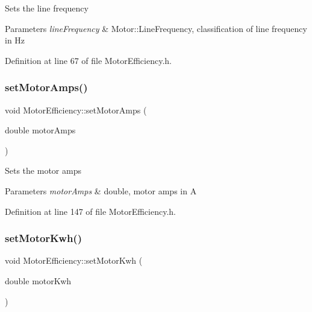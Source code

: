 Sets the line frequency 
\begin{DoxyParams}{Parameters}
{\em line\+Frequency} & Motor\+::\+Line\+Frequency, classification of line frequency in Hz \\
\hline
\end{DoxyParams}


Definition at line 67 of file Motor\+Efficiency.\+h.

\mbox{\label{class_motor_efficiency_ac86aa8d6162e63eb440e07e557534c74}} 
\subsubsection{\texorpdfstring{set\+Motor\+Amps()}{setMotorAmps()}}
{\footnotesize\ttfamily void Motor\+Efficiency\+::set\+Motor\+Amps (\begin{DoxyParamCaption}\item[{double}]{motor\+Amps }\end{DoxyParamCaption})\hspace{0.3cm}{\ttfamily [inline]}}

Sets the motor amps 
\begin{DoxyParams}{Parameters}
{\em motor\+Amps} & double, motor amps in A \\
\hline
\end{DoxyParams}


Definition at line 147 of file Motor\+Efficiency.\+h.

\mbox{\label{class_motor_efficiency_ab1c7507bac259565e43a6777d079148b}} 
\subsubsection{\texorpdfstring{set\+Motor\+Kwh()}{setMotorKwh()}}
{\footnotesize\ttfamily void Motor\+Efficiency\+::set\+Motor\+Kwh (\begin{DoxyParamCaption}\item[{double}]{motor\+Kwh }\end{DoxyParamCaption})\hspace{0.3cm}{\ttfamily [inline]}}

